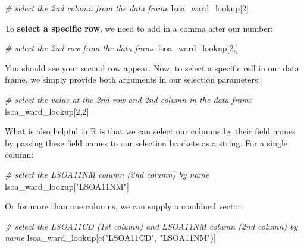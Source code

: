 \documentclass[
]{book}
\newenvironment{Shaded}{\begin{snugshade}}{\end{snugshade}}
\newcommand{\CommentTok}[1]{\textcolor[rgb]{0.56,0.35,0.01}{\textit{#1}}}
\newcommand{\DecValTok}[1]{\textcolor[rgb]{0.00,0.00,0.81}{#1}}
\newcommand{\FunctionTok}[1]{\textcolor[rgb]{0.00,0.00,0.00}{#1}}
\newcommand{\NormalTok}[1]{#1}
\newcommand{\StringTok}[1]{\textcolor[rgb]{0.31,0.60,0.02}{#1}}
\begin{document}
\begin{Shaded}
\begin{Highlighting}[]
\CommentTok{\# select the 2nd column from the data frame}
\NormalTok{lsoa\_ward\_lookup[}\DecValTok{2}\NormalTok{]}
\end{Highlighting}
\end{Shaded}

To \textbf{select a specific row}, we need to add in a comma after our number:

\begin{Shaded}
\begin{Highlighting}[]
\CommentTok{\# select the 2nd row from the data frame}
\NormalTok{lsoa\_ward\_lookup[}\DecValTok{2}\NormalTok{,]}
\end{Highlighting}
\end{Shaded}

You should see your second row appear. Now, to select a specific cell in our data frame, we simply provide both arguments in our selection parameters:

\begin{Shaded}
\begin{Highlighting}[]
\CommentTok{\# select the value at the 2nd row and 2nd column in the data frame}
\NormalTok{lsoa\_ward\_lookup[}\DecValTok{2}\NormalTok{,}\DecValTok{2}\NormalTok{]}
\end{Highlighting}
\end{Shaded}

What is also helpful in R is that we can select our columns by their field names by passing these field names to our selection brackets as a string. For a single column:

\begin{Shaded}
\begin{Highlighting}[]
\CommentTok{\# select the LSOA11NM column (2nd column) by name}
\NormalTok{lsoa\_ward\_lookup[}\StringTok{"LSOA11NM"}\NormalTok{]}
\end{Highlighting}
\end{Shaded}

Or for more than one columns, we can supply a combined vector:

\begin{Shaded}
\begin{Highlighting}[]
\CommentTok{\# select the LSOA11CD (1st column) and LSOA11NM column (2nd column) by name}
\NormalTok{lsoa\_ward\_lookup[}\FunctionTok{c}\NormalTok{(}\StringTok{"LSOA11CD"}\NormalTok{, }\StringTok{"LSOA11NM"}\NormalTok{)]}
\end{Highlighting}
\end{Shaded}
\end{document}
